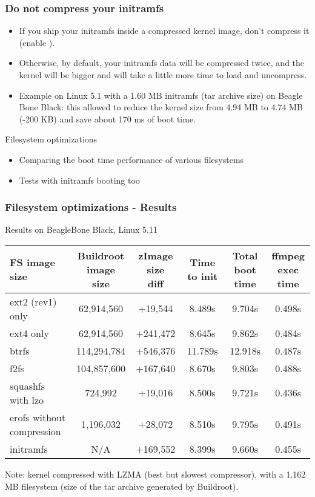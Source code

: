 \begin{frame}
\frametitle{Do not compress your initramfs}
\begin{itemize}
\item If you ship your initramfs inside a compressed kernel image, don't compress
      it \\
      (enable ).
\item Otherwise, by default, your initramfs data will be compressed twice, and
      the kernel will be bigger and will take a little more time to load
      and uncompress.
\item Example on Linux 5.1 with a 1.60 MB initramfs (tar archive size)
      on Beagle Bone Black: this allowed to reduce the kernel size from 4.94
      MB to 4.74 MB (-200 KB) and save about 170 ms of boot time.
\end{itemize}
\end{frame}

\setuplabframe
{Filesystem optimizations}
{
\begin{itemize}
\item Comparing the boot time performance of various filesystems
\item Tests with initramfs booting too
\end{itemize}
}

\begin{frame}
\frametitle{Filesystem optimizations - Results}
Results on BeagleBone Black, Linux 5.11
\small
\begin{tabular}{| l || c | c | c | c | c |}
\hline
FS image size & \makecell{Buildroot\\ image size} & \makecell{zImage
size\\ diff} & Time to init & \makecell{Total\\ boot time} & \makecell{ffmpeg\\ exec
time}\\
\hline
ext2 (rev1) only & 62,914,560 & +19,544 & 8.489s & 9.704s & 0.498s \\
\hline
ext4 only & 62,914,560 & +241,472 & 8.645s & 9.862s & 0.484s \\
\hline
btrfs & 114,294,784 & +546,376 & 11.789s & 12.918s & 0.487s \\
\hline
f2fs & 104,857,600 & +167,640 & 8.670s & 9.803s & 0.488s \\
\hline
squashfs with lzo & 724,992 & +19,016 & 8.500s & 9.721s & 0.436s \\
\hline
erofs without compression & 1,196,032 & +28,072 & 8.510s & 9.795s & 0.491s \\
\hline
initramfs & N/A & +169,552 & 8.399s & 9.660s & 0.455s \\
\hline
\end{tabular}
\vfill
Note:  kernel compressed with LZMA (best but slowest
compressor), with a 1.162 MB filesystem (size of the tar archive
generated by Buildroot).
\end{frame}


